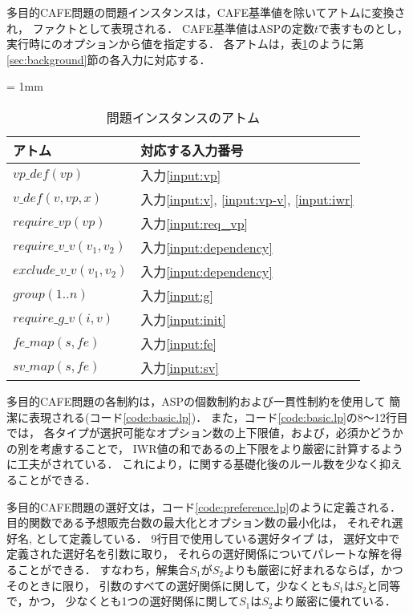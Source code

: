 多目的CAFE問題の問題インスタンスは，CAFE基準値を除いてアトムに変換され，
ファクトとして表現される．
CAFE基準値はASPの定数$t$で表すものとし，実行時に\clingo のオプションから値を指定する．
各アトムは，表\ref{tab:fact}のように第\ref{sec:background}節の各入力に対応する．
\begin{table}[t]
 \caption{問題インスタンスのアトム}
 \centering
 \tabcolsep = 1mm
 \begin{tabular}{ll} \bhline
  アトム & 対応する入力番号 \\ \hline
  $vp\_def(vp)$ & 入力\ref{input:vp} \\
  $v\_def(v,vp,x)$ & 入力\ref{input:v}, \ref{input:vp-v}, \ref{input:iwr} \\
  $require\_vp(vp)$ & 入力\ref{input:req_vp} \\
  $require\_v\_v(v_1,v_2)$ & 入力\ref{input:dependency} \\
  $exclude\_v\_v(v_1,v_2)$ & 入力\ref{input:dependency} \\
  $group(1..n)$ & 入力\ref{input:g} \\ 
  $require\_g\_v(i,v)$ & 入力\ref{input:init} \\
  $fe\_map(s,fe)$ & 入力\ref{input:fe} \\
  $sv\_map(s,fe)$ & 入力\ref{input:sv} \\ \hline
 \end{tabular}
 \label{tab:fact}
\end{table}

多目的CAFE問題の各制約は，ASPの個数制約および一貫性制約を使用して
簡潔に表現される(コード\ref{code:basic.lp})．
また，コード\ref{code:basic.lp}の8〜12行目では，
各タイプが選択可能なオプション数の上下限値，および，必須かどうかの別を考慮することで，
IWR値の和であるの上下限をより厳密に計算するように工夫がされている．
これにより，に関する基礎化後のルール数を少なく抑えることができる．

 


多目的CAFE問題の選好文は，コード\ref{code:preference.lp}のように定義される．
目的関数である予想販売台数の最大化とオプション数の最小化は，
それぞれ選好名,  として定義している．
9行目で使用している選好タイプ は，
選好文中で定義された選好名を引数に取り，
それらの選好関係についてパレートな解を得ることができる．
すなわち，解集合$S_1$が$S_2$よりも厳密に好まれるならば，かつそのときに限り，
引数のすべての選好関係に関して，少なくとも$S_1$は$S_2$と同等で，かつ，
少なくとも1つの選好関係に関して$S_1$は$S_2$より厳密に優れている．

